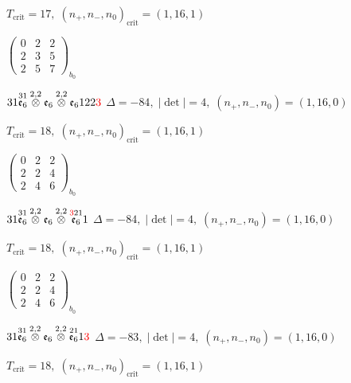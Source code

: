 \documentclass[10pt]{article}
\begin{document}
\hspace{1em}$T_{\text{crit}}=17,\; (n_+,n_-,n_0)_{\text{crit}}=(1,16,1)$

\hspace{2em}$\left(\begin{smallmatrix}0 & 2 & 2 \\ 2 & 3 & 5 \\ 2 & 5 & 7\end{smallmatrix}\right)_{\!b_0}$

\smallskip

$31\overset{31}{\mathfrak{e}_6}\overset{2,2}{\otimes}\mathfrak{e}_6\overset{2,2}{\otimes}\mathfrak{e}_6122\textcolor{red}{3}$ \quad $\Delta=-84,\; |\det|=4,\; (n_+,n_-,n_0)=(1,16,0)$

\hspace{1em}$T_{\text{crit}}=18,\; (n_+,n_-,n_0)_{\text{crit}}=(1,16,1)$

\hspace{2em}$\left(\begin{smallmatrix}0 & 2 & 2 \\ 2 & 2 & 4 \\ 2 & 4 & 6\end{smallmatrix}\right)_{\!b_0}$

\smallskip

$31\overset{31}{\mathfrak{e}_6}\overset{2,2}{\otimes}\mathfrak{e}_6\overset{2,2}{\otimes}\overset{\textcolor{red}{3}21}{\mathfrak{e}_6}1$ \quad $\Delta=-84,\; |\det|=4,\; (n_+,n_-,n_0)=(1,16,0)$

\hspace{1em}$T_{\text{crit}}=18,\; (n_+,n_-,n_0)_{\text{crit}}=(1,16,1)$

\hspace{2em}$\left(\begin{smallmatrix}0 & 2 & 2 \\ 2 & 2 & 4 \\ 2 & 4 & 6\end{smallmatrix}\right)_{\!b_0}$

$31\overset{31}{\mathfrak{e}_6}\overset{2,2}{\otimes}\mathfrak{e}_6\overset{2,2}{\otimes}\overset{21}{\mathfrak{e}_6}1\textcolor{red}{3}$ \quad $\Delta=-83,\; |\det|=4,\; (n_+,n_-,n_0)=(1,16,0)$

\hspace{1em}$T_{\text{crit}}=18,\; (n_+,n_-,n_0)_{\text{crit}}=(1,16,1)$
\end{document}

